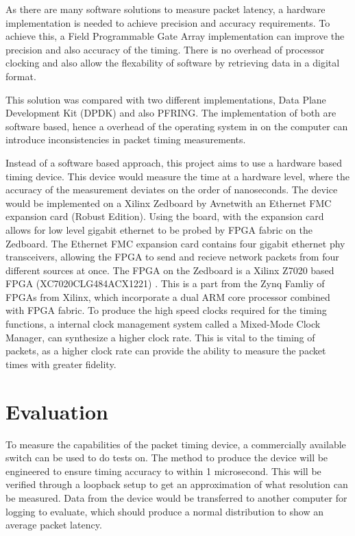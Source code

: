 \par As there are many software solutions to measure packet latency, a hardware implementation is needed to achieve precision and accuracy requirements.
To achieve this, a Field Programmable Gate Array implementation can improve the precision and also accuracy of the timing.
There is no overhead of processor clocking and also allow the flexability of software by retrieving data in a digital format.


\par This solution was compared with two different implementations, Data Plane Development Kit (DPDK) and also PF\textunderscore RING.
The implementation of both are software based, hence a overhead of the operating system in on the computer can introduce inconsistencies in packet timing measurements.

\par Instead of a software based approach, this project aims to use a hardware based timing device.
This device would measure the time at a hardware level, where the accuracy of the measurement deviates on the order of nanoseconds.
The device would be implemented on a Xilinx Zedboard by Avnet\texttrademark with an Ethernet FMC expansion card (Robust Edition).
Using the board, with the expansion card allows for low level gigabit ethernet to be probed by FPGA fabric on the Zedboard.
The Ethernet FMC expansion card contains four gigabit ethernet phy transceivers, allowing the FPGA to send and recieve network packets from four different sources at once.
The FPGA on the Zedboard is a Xilinx Z7020 based FPGA (XC7020CLG484ACX1221) \cite{fpga}.
This is a part from the Zynq Famliy of FPGAs from Xilinx, which incorporate a dual ARM core processor combined with FPGA fabric.
To produce the high speed clocks required for the timing functions, a internal clock management system called a Mixed-Mode Clock Manager, can synthesize a higher clock rate.
This is vital to the timing of packets, as a higher clock rate can provide the ability to measure the packet times with greater fidelity.

\section{Evaluation}
To measure the capabilities of the packet timing device, a commercially available switch can be used to do tests on.
The method to produce the device will be engineered to ensure timing accuracy to within 1 microsecond.
This will be verified through a loopback setup to get an approximation of what resolution can be measured.
Data from the device would be transferred to another computer for logging to evaluate, which should produce a normal distribution to show an average packet latency.
